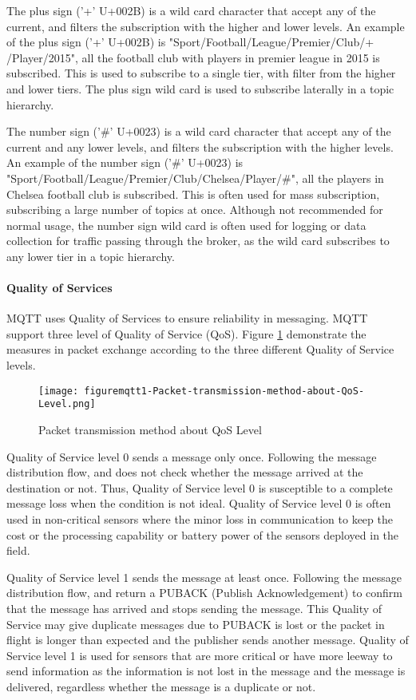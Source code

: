 The plus sign ('+' U+002B) is a wild card character that accept any of the current, and filters the subscription with the higher and lower levels. An example of the plus sign ('+' U+002B) is "Sport/Football/League/Premier/Club/+ /Player/2015", all the football club with players in premier league in 2015 is subscribed. This is used to subscribe to a single tier, with filter from the higher and lower tiers. The plus sign wild card is used to subscribe laterally in a topic hierarchy.

The number sign ('\#' U+0023) is a wild card character that accept any of the current and any lower levels, and filters the subscription with the higher levels. An example of the number sign ('\#' U+0023)  is "Sport/Football/League/Premier/Club/Chelsea/Player/\#", all the players in Chelsea football club is subscribed. This is often used for mass subscription, subscribing a large number of topics at once. Although not recommended for normal usage, the number sign wild card is often used for logging or data collection for traffic passing through the broker, as the wild card subscribes to any lower tier in a topic hierarchy.

\paragraph{Quality of Services}
MQTT uses Quality of Services to ensure reliability in messaging. MQTT support three level of Quality of Service (QoS). Figure \ref{fig:mqtt1} demonstrate the measures in packet exchange according to the three different Quality of Service levels.

\begin{figure}[H]
\centering
\texttt{[image: figuremqtt1-Packet-transmission-method-about-QoS-Level.png]}
\caption{Packet transmission method about QoS Level \protect\cite{mqtt}}
\label{fig:mqtt1}
\end{figure}

Quality of Service level 0 sends a message only once. Following the message distribution flow, and does not check whether the message arrived at the destination or not. Thus, Quality of Service level 0 is susceptible to a complete message loss when the condition is not ideal. Quality of Service level 0 is often used in non-critical sensors where the minor loss in communication to keep the cost or the processing capability or battery power of the sensors deployed in the field.

Quality of Service level 1 sends the message at least once. Following the message distribution flow, and return a PUBACK (Publish Acknowledgement) to confirm that the message has arrived and stops sending the message. This Quality of Service may give duplicate messages due to PUBACK is lost or the packet in flight is longer than expected and the publisher sends another message. Quality of Service level 1 is used for sensors that are more critical or have more leeway to send information as the information is not lost in the message and the message is delivered, regardless whether the message is a duplicate or not.


